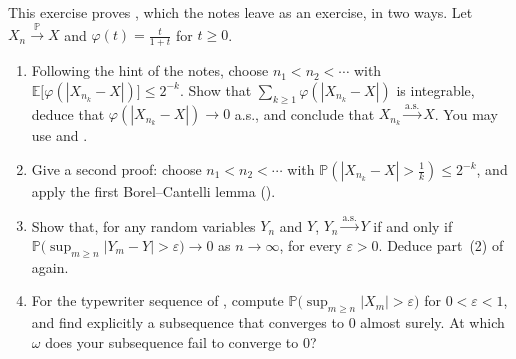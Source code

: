 \begin{exercise}\label{ex:ll-subsequence}
\medium This exercise proves , which the notes leave as an exercise,
in two ways. Let $X_n\xrightarrow{\mathbb P}X$ and $\varphi(t)=\frac t{1+t}$ for $t\ge0$.
\begin{enumerate}[label=(\alph*)]
  \item Following the hint of the notes, choose $n_1<n_2<\cdots$ with
    $\mathbb E\big[\varphi(|X_{n_k}-X|)\big]\le2^{-k}$. Show that
    $\sum_{k\ge1}\varphi(|X_{n_k}-X|)$ is integrable, deduce that $\varphi(|X_{n_k}-X|)\to0$ a.s.,
    and conclude that $X_{n_k}\xrightarrow{\text{a.s.}}X$. You may use 
    and .
  \item Give a second proof: choose $n_1<n_2<\cdots$ with
    $\mathbb P(|X_{n_k}-X|>\frac1k)\le2^{-k}$, and apply the first Borel--Cantelli lemma
    ().
  \item Show that, for any random variables $Y_n$ and $Y$, $Y_n\xrightarrow{\text{a.s.}}Y$ if and only
    if $\mathbb P\big(\sup_{m\ge n}|Y_m-Y|>\varepsilon\big)\to0$ as $n\to\infty$, for every
    $\varepsilon>0$. Deduce part~(2) of  again.
  \item For the typewriter sequence of , compute
    $\mathbb P\big(\sup_{m\ge n}|X_m|>\varepsilon\big)$ for $0<\varepsilon<1$, and find explicitly
    a subsequence that converges to $0$ almost surely. At which $\omega$ does your subsequence
    fail to converge to $0$?
\end{enumerate}
\end{exercise}

